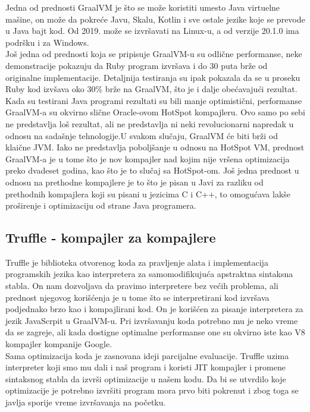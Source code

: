 \documentclass[a4paper]{article}
\begin{document}
Jedna od prednosti GraalVM je što se može koristiti umesto Java virtuelne mašine, on može da pokreće Javu, Skalu, Kotlin i sve ostale jezike koje se prevode u Java bajt kod. Od 2019. može se izvršavati na Linux-u, a od verzije 20.1.0 ima podršku i za Windows. \\

Još jedna od prednosti koja se pripisuje GraalVM-u su odlične performanse, neke demonstracije pokazuju da Ruby program izvršava i do 30 puta brže od originalne implementacije.
Detaljnija testiranja su ipak pokazala da se u proseku Ruby kod izvšava oko 30\%  brže na GraalVM, što je i dalje obećavajući rezultat. \\

Kada su testirani Java programi rezultati su bili manje optimistični, performanse GraalVM-a su okvirno slične Oracle-ovom HotSpot kompajleru. Ovo samo po sebi ne predstavlja loš rezultat, ali ne predstavlja ni neki revolucionarni napredak u odnosu na sadašnje tehnologije.U svakom slučaju, GraalVM će biti brži od klaične JVM. Iako ne predstavlja poboljšanje u odnosu na HotSpot VM, prednost GraalVM-a je u tome što je nov kompajler nad kojim nije vršena optimizacija preko dvadeset godina, kao što je to slučaj sa HotSpot-om. Još jedna prednost u odnosu na prethodne kompajlere je to što je pisan u Javi za razliku od prethodnih kompajlera koji su pisani u jezicima C i C++, to omogućava lakše proširenje i optimizaciju od strane Java programera.

\subsection{Truffle - kompajler za kompajlere}
\label{Truffle - kompajler za kompajlere}

Truffle je biblioteka otvorenog koda za pravljenje alata i implementacija programskih jezika kao interpretera za samomodifikujuća apstraktna sintaksna stabla. On nam dozvoljava 
da pravimo interpretere bez većih problema, ali prednost njegovog korišćenja je u tome što se interpretirani kod izvršava podjednako brzo kao i kompajlirani kod.
On je korišćen za pisanje interpretera za jezik JavaScrpit u GraalVM-u. Pri izvršavanju koda potrebno mu je neko vreme da se zagreje, ali kada dostigne optimalne performanse
one su okvirno iste kao V8 kompajler kompanije Google. \\

Sama optimizacija koda je zasnovana ideji parcijalne evaluacije. Truffle uzima interpreter koji smo mu dali i naš program i koristi JIT kompajler i promene sintaksnog stabla da izvrši optimizacije u našem kodu. Da bi se utvrdilo koje optimizacije je potrebno izvršiti program mora prvo biti pokrenut i zbog toga se javlja sporije vreme izvršavanja na početku.\\
\end{document}
